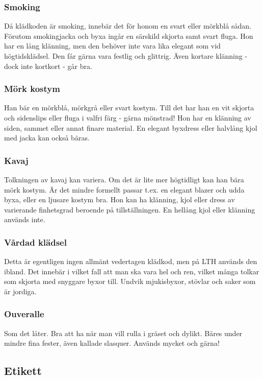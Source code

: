 \documentclass{article}
\begin{document}
\subsubsection{Smoking}
Då klädkoden är smoking, innebär det för honom en svart
eller mörkblå sådan. Förutom smokingjacka och byxa
ingår en särskild skjorta samt svart fluga. Hon har en lång
klänning, men den behöver inte vara lika elegant som vid
högtidsklädsel. Den får gärna vara festlig och glittrig.
Även kortare klänning - dock inte kortkort - går bra.

\subsubsection{Mörk kostym}
Han bär en mörkblå, mörkgrå eller svart kostym. Till det
har han en vit skjorta och sidenslips eller fluga i valfri färg
- gärna mönstrad! Hon har en klänning av siden, sammet
eller annat finare material. En elegant byxdress eller
halvlång kjol med jacka kan också bäras.

\subsubsection{Kavaj}
Tolkningen av kavaj kan variera. Om det är lite mer
högtidligt kan han bära mörk kostym. Är det mindre
formellt passar t.ex. en elegant blazer och udda byxa,
eller en ljusare kostym bra. Hon kan ha klänning, kjol eller
dress av varierande finhetsgrad beroende på
tillställningen. En hellång kjol eller klänning används inte.

\subsubsection{Vårdad klädsel}
Detta är egentligen ingen allmänt vedertagen klädkod,
men på LTH används den ibland. Det innebär i vilket fall
att man ska vara hel och ren, vilket många tolkar som
skjorta med snyggare byxor till. Undvik mjukisbyxor,
stövlar och saker som är jordiga.

\subsubsection{Ouveralle}
Som det låter. Bra att ha när man vill rulla i gräset och
dylikt. Bäres under mindre fina fester, även kallade
slasquer. Används mycket och gärna!

\newpage
\subsection{Etikett}
\end{document}
